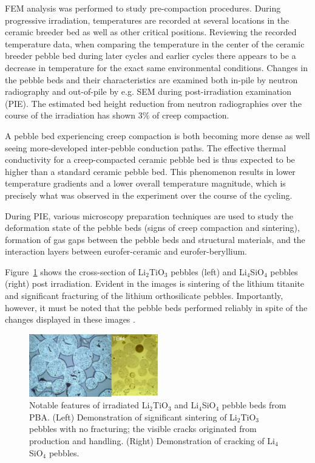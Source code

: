 FEM analysis was performed to study pre-compaction procedures.  During progressive irradiation, temperatures are recorded at several locations in the ceramic breeder bed as well as other critical positions. Reviewing the recorded temperature data, when comparing the temperature in the center of the ceramic breeder pebble bed during later cycles and earlier cycles there appears to be a decrease in temperature for the exact same environmental conditions. Changes in the pebble beds and their characteristics are examined both in-pile by neutron radiography and out-of-pile by e.g. SEM during post-irradiation examination (PIE). The estimated bed height reduction from neutron radiographies over the course of the irradiation has shown 3\% of creep compaction. 

A pebble bed experiencing creep compaction is both becoming more dense as well seeing more-developed inter-pebble conduction paths. The effective thermal conductivity for a creep-compacted ceramic pebble bed is thus expected to be higher than a standard ceramic pebble bed. This phenomenon results in lower temperature gradients and a lower overall temperature magnitude, which is precisely what was observed in the experiment over the course of the cycling. 

During PIE, various microscopy preparation techniques are used to study the deformation state of the pebble beds (signs of creep compaction and sintering), formation of gas gaps between the pebble beds and structural materials, and the interaction layers between eurofer-ceramic and eurofer-beryllium. 

Figure~\ref{fig:pba} shows the cross-section of Li$_2$TiO$_3$ pebbles (left) and Li$_4$SiO$_4$ pebbles (right) post irradiation. Evident in the images is sintering of the lithium titanite and significant fracturing of the lithium orthosilicate pebbles. Importantly, however, it must be noted that the pebble beds performed reliably in spite of the changes displayed in these images \cite{magielsen2011}. 


\begin{figure}[t!]
\centering
\includegraphics[width=0.5\textwidth]{chapters/figures/Fig-10}
\caption{Notable features of irradiated Li$_2$TiO$_3$ and Li$_4$SiO$_4$ pebble beds from PBA\cite{magielsen2011}. (Left) Demonstration of significant sintering of Li$_2$TiO$_3$ pebbles with no fracturing; the visible cracks originated from production and handling. (Right) Demonstration of cracking of Li$_4$SiO$_4$ pebbles.}
\label{fig:pba}
\end{figure}



